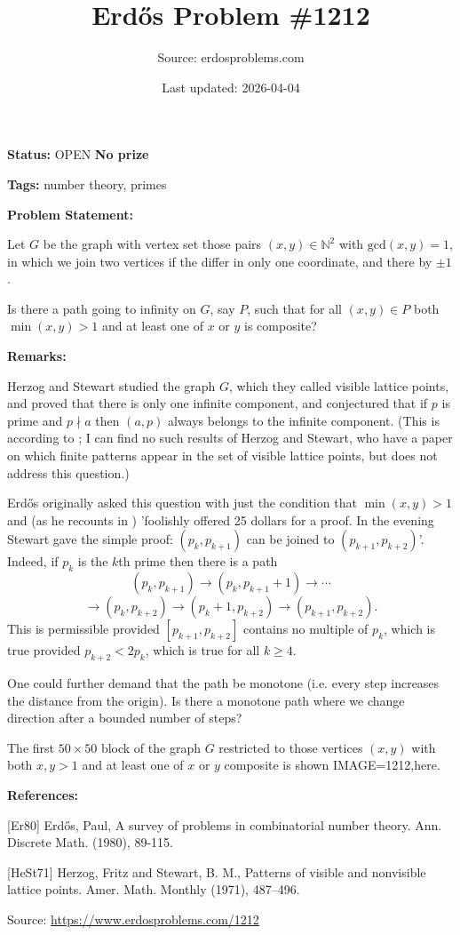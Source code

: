 \documentclass{article}
\title{Erd\H{o}s Problem \#1212}
\date{Last updated: 2026-04-04}
\author{Source: erdosproblems.com}
\begin{document}
\maketitle

\noindent\textbf{Status:} OPEN \quad \textbf{No prize}

\noindent\textbf{Tags:} number theory, primes

\medskip
\noindent\textbf{Problem Statement:}

Let $G$ be the graph with vertex set those pairs $(x,y)\in \mathbb{N}^2$ with $\mathrm{gcd}(x,y)=1$, in which we join two vertices if the differ in only one coordinate, and there by $\pm 1$.

Is there a path going to infinity on $G$, say $P$, such that for all $(x,y)\in P$ both $\min(x,y)>1$ and at least one of $x$ or $y$ is composite?

\bigskip
\noindent\textbf{Remarks:}

Herzog and Stewart studied the graph $G$, which they called visible lattice points, and proved that there is only one infinite component, and conjectured that if $p$ is prime and $p\nmid a$ then $(a,p)$ always belongs to the infinite component. (This is according to \cite{Er80}; I can find no such results of Herzog and Stewart, who have a paper \cite{HeSt71} on which finite patterns appear in the set of visible lattice points, but does not address this question.)

Erd\H{o}s originally asked this question with just the condition that $\min(x,y)>1$ and (as he recounts in \cite{Er80}) 'foolishly offered 25 dollars for a proof. In the evening Stewart gave the simple proof: $(p_k,p_{k+1})$ can be joined to $(p_{k+1},p_{k+2})$'. Indeed, if $p_k$ is the $k$th prime then there is a path\[(p_k,p_{k+1})\to (p_k,p_{k+1}+1)\to \cdots \]\[\to (p_{k},p_{k+2})\to (p_{k}+1,p_{k+2})\to (p_{k+1},p_{k+2}).\]This is permissible provided $[p_{k+1},p_{k+2}]$ contains no multiple of $p_k$, which is true provided $p_{k+2}<2p_{k}$, which is true for all $k\geq 4$.

One could further demand that the path be monotone (i.e. every step increases the distance from the origin). Is there a monotone path where we change direction after a bounded number of steps?

The first $50\times 50$ block of the graph $G$ restricted to those vertices $(x,y)$ with both $x,y>1$ and at least one of $x$ or $y$ composite is shown {IMAGE=1212,here}.

\bigskip
\noindent\textbf{References:}

[Er80] Erd\H{o}s, Paul, A survey of problems in combinatorial number theory. Ann. Discrete Math. (1980), 89-115.
 
 [HeSt71] Herzog, Fritz and Stewart, B. M., Patterns of visible and nonvisible lattice points. Amer. Math. Monthly (1971), 487--496.

\bigskip
\noindent\small{Source: \url{https://www.erdosproblems.com/1212}}
\end{document}
